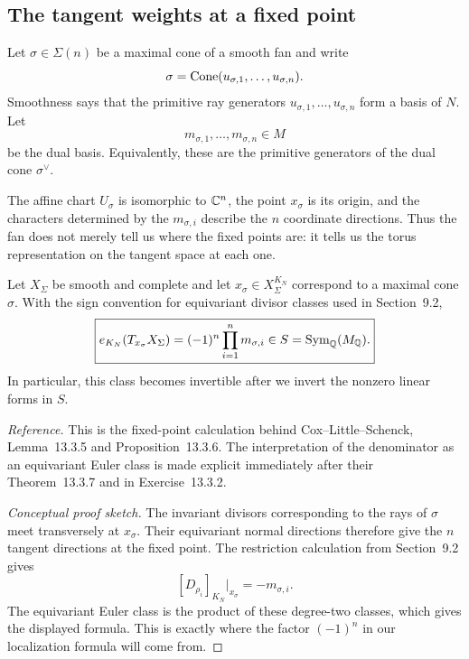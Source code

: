 \subsection{The tangent weights at a fixed point}

Let \(\sigma\in\Sigma(n)\) be a maximal cone of a smooth fan and write
\[
\sigma=\operatorname{Cone}(u_{\sigma,1},\ldots,u_{\sigma,n}).
\]
Smoothness says that the primitive ray generators
\(u_{\sigma,1},\ldots,u_{\sigma,n}\) form a basis of \(N\).  Let
\[
m_{\sigma,1},\ldots,m_{\sigma,n}\in M
\]
be the dual basis.  Equivalently, these are the primitive generators of
the dual cone \(\sigma^\vee\).

The affine chart \(U_\sigma\) is isomorphic to \(\mathbb{C}^n\), the point
\(x_\sigma\) is its origin, and the characters determined by the
\(m_{\sigma,i}\) describe the \(n\) coordinate directions.  Thus the
fan does not merely tell us where the fixed points are: it tells us the
torus representation on the tangent space at each one.

\begin{proposition}
\label{prop:toric-fixed-point-euler-class}
Let \(X_\Sigma\) be smooth and complete and let
\(x_\sigma\in X_\Sigma^{K_N}\) correspond to a maximal cone
\(\sigma\).  With the sign convention for equivariant divisor classes
used in Section~9.2,
\[
\boxed{
e_{K_N}(T_{x_\sigma}X_\Sigma)
=
(-1)^n\prod_{i=1}^n m_{\sigma,i}
\in S=\operatorname{Sym}_{\mathbb{Q}}(M_{\mathbb{Q}}).
}
\]
In particular, this class becomes invertible after we invert the
nonzero linear forms in \(S\).
\end{proposition}

\noindent
\textit{Reference.}
This is the fixed-point calculation behind Cox--Little--Schenck,
Lemma~13.3.5 and Proposition~13.3.6.  The interpretation of the
denominator as an equivariant Euler class is made explicit immediately
after their Theorem~13.3.7 and in Exercise~13.3.2.

\begin{proof}[Conceptual proof sketch]
The invariant divisors corresponding to the rays of \(\sigma\) meet
transversely at \(x_\sigma\).  Their equivariant normal directions
therefore give the \(n\) tangent directions at the fixed point.  The
restriction calculation from Section~9.2 gives
\[
[D_{\rho_i}]_{K_N}|_{x_\sigma}=-m_{\sigma,i}.
\]
The equivariant Euler class is the product of these degree-two classes,
which gives the displayed formula.  This is exactly where the factor
\((-1)^n\) in our localization formula will come from.
\end{proof}

